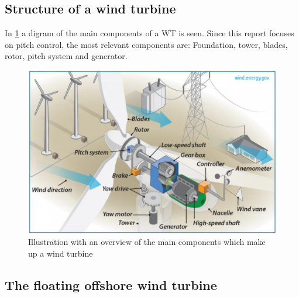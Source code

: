 \subsection{Structure of a wind turbine}
In \cref{fig:wt_components} a digram of the main components of a WT is seen. Since this report focuses on pitch control, the most relevant components are: Foundation, tower, blades, rotor, pitch system and generator.

\begin{figure}[h]
	\centering
	\includegraphics[width=0.7\linewidth]{Graphics/WtComponents.png}
	\caption{Illustration with an overview of the main components which make up a wind turbine}
	\label{fig:wt_components}
\end{figure}

\subsection{The floating offshore wind turbine}

